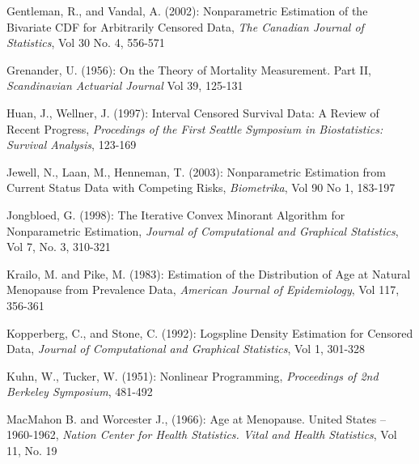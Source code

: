 \documentclass[12pt]{article}
\numberwithin{equation}{section}
\begin{document}
\vspace{3mm}

Gentleman, R., and Vandal, A. (2002): Nonparametric Estimation of the Bivariate CDF for Arbitrarily Censored Data, \emph{The Canadian Journal of Statistics}, Vol 30 No. 4, 556-571

\vspace{3mm}

Grenander, U. (1956): On the Theory of Mortality Measurement. Part II, \emph{Scandinavian Actuarial Journal} Vol 39, 125-131


\vspace{3mm}

Huan, J., Wellner, J. (1997): Interval Censored Survival Data: A Review of Recent Progress, \emph{Procedings of the First Seattle Symposium in Biostatistics: Survival Analysis}, 123-169

\vspace{3mm}

Jewell, N., Laan, M., Henneman, T. (2003): Nonparametric Estimation from Current Status Data with Competing Risks, \emph{Biometrika}, Vol 90 No 1, 183-197

\vspace{3mm}

Jongbloed, G. (1998): The Iterative Convex Minorant Algorithm for Nonparametric Estimation, \emph{Journal of Computational and Graphical Statistics}, Vol 7, No. 3, 310-321

\vspace{3mm}

Krailo, M. and Pike, M. (1983): Estimation of the Distribution of Age at Natural Menopause from Prevalence Data, \emph{American Journal of Epidemiology}, Vol 117, 356-361

\vspace{3mm}

Kopperberg, C., and Stone, C. (1992): Logspline Density Estimation for Censored Data, \emph{Journal of Computational and Graphical Statistics}, Vol 1, 301-328

\vspace{3mm}

Kuhn, W., Tucker, W. (1951): Nonlinear Programming, \emph{Proceedings of 2nd Berkeley Symposium}, 481-492

\vspace{3mm}

MacMahon B. and Worcester J., (1966): Age at Menopause. United States -- 1960-1962, \emph{Nation Center for Health Statistics. Vital and Health Statistics}, Vol 11, No. 19
\end{document}
